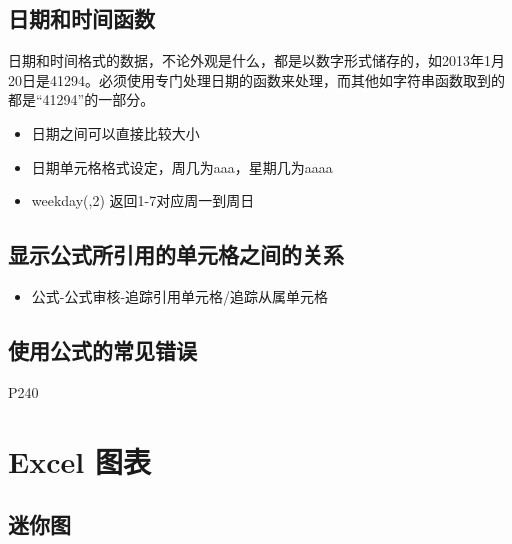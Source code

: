\documentclass[]{ctexbook}
\providecommand{\tightlist}{%
  \setlength{\itemsep}{0pt}\setlength{\parskip}{0pt}}
\begin{document}
\hypertarget{ux65e5ux671fux548cux65f6ux95f4ux51fdux6570}{%
\section{日期和时间函数}\label{ux65e5ux671fux548cux65f6ux95f4ux51fdux6570}}

日期和时间格式的数据，不论外观是什么，都是以数字形式储存的，如2013年1月20日是41294。必须使用专门处理日期的函数来处理，而其他如字符串函数取到的都是``41294''的一部分。

\begin{itemize}
\tightlist
\item
  日期之间可以直接比较大小
\item
  日期单元格格式设定，周几为aaa，星期几为aaaa
\item
  weekday(,2) 返回1-7对应周一到周日
\end{itemize}

\hypertarget{ux663eux793aux516cux5f0fux6240ux5f15ux7528ux7684ux5355ux5143ux683cux4e4bux95f4ux7684ux5173ux7cfb}{%
\section{显示公式所引用的单元格之间的关系}\label{ux663eux793aux516cux5f0fux6240ux5f15ux7528ux7684ux5355ux5143ux683cux4e4bux95f4ux7684ux5173ux7cfb}}

\begin{itemize}
\tightlist
\item
  公式-公式审核-追踪引用单元格/追踪从属单元格
\end{itemize}

\hypertarget{ux4f7fux7528ux516cux5f0fux7684ux5e38ux89c1ux9519ux8bef}{%
\section{使用公式的常见错误}\label{ux4f7fux7528ux516cux5f0fux7684ux5e38ux89c1ux9519ux8bef}}

P240

\hypertarget{excel-ux56feux8868}{%
\chapter{Excel 图表}\label{excel-ux56feux8868}}

\hypertarget{ux8ff7ux4f60ux56fe}{%
\section{迷你图}\label{ux8ff7ux4f60ux56fe}}
\end{document}
